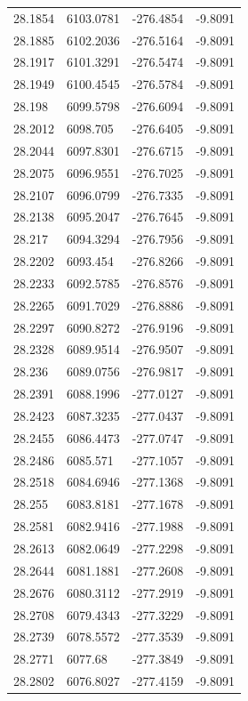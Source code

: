 \begin{table}[H]
\begin{tabular}{llll}
28.1854 & 6103.0781 & -276.4854 & -9.8091 \\
28.1885 & 6102.2036 & -276.5164 & -9.8091 \\
28.1917 & 6101.3291 & -276.5474 & -9.8091 \\
28.1949 & 6100.4545 & -276.5784 & -9.8091 \\
28.198 & 6099.5798 & -276.6094 & -9.8091 \\
28.2012 & 6098.705 & -276.6405 & -9.8091 \\
28.2044 & 6097.8301 & -276.6715 & -9.8091 \\
28.2075 & 6096.9551 & -276.7025 & -9.8091 \\
28.2107 & 6096.0799 & -276.7335 & -9.8091 \\
28.2138 & 6095.2047 & -276.7645 & -9.8091 \\
28.217 & 6094.3294 & -276.7956 & -9.8091 \\
28.2202 & 6093.454 & -276.8266 & -9.8091 \\
28.2233 & 6092.5785 & -276.8576 & -9.8091 \\
28.2265 & 6091.7029 & -276.8886 & -9.8091 \\
28.2297 & 6090.8272 & -276.9196 & -9.8091 \\
28.2328 & 6089.9514 & -276.9507 & -9.8091 \\
28.236 & 6089.0756 & -276.9817 & -9.8091 \\
28.2391 & 6088.1996 & -277.0127 & -9.8091 \\
28.2423 & 6087.3235 & -277.0437 & -9.8091 \\
28.2455 & 6086.4473 & -277.0747 & -9.8091 \\
28.2486 & 6085.571 & -277.1057 & -9.8091 \\
28.2518 & 6084.6946 & -277.1368 & -9.8091 \\
28.255 & 6083.8181 & -277.1678 & -9.8091 \\
28.2581 & 6082.9416 & -277.1988 & -9.8091 \\
28.2613 & 6082.0649 & -277.2298 & -9.8091 \\
28.2644 & 6081.1881 & -277.2608 & -9.8091 \\
28.2676 & 6080.3112 & -277.2919 & -9.8091 \\
28.2708 & 6079.4343 & -277.3229 & -9.8091 \\
28.2739 & 6078.5572 & -277.3539 & -9.8091 \\
28.2771 & 6077.68 & -277.3849 & -9.8091 \\
28.2802 & 6076.8027 & -277.4159 & -9.8091 \\

\end{tabular}
\end{table}
